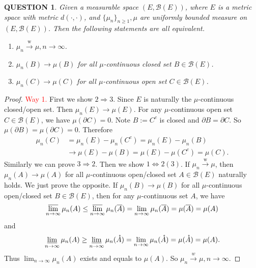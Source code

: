 \documentclass[12pt]{article}
\renewcommand{\b}{\mathscr{B}}
\renewcommand{\(}{\left(}%
\renewcommand{\)}{\right)}%
\renewcommand{\[}{\left[}%
\renewcommand{\]}{\right]}%
\newtheorem{question}{QUESTION}[section]}
\newtheorem{proof}{Proof.}}
\begin{document}
  \begin{question}
  	Given a measurable space $(E,\b(E))$, where $E$ is a metric space with metric $d(\cdot,\cdot)$, and $\{\mu_n\}_{n\geq 1},\mu$ are uniformly bounded measure on $(E,\b(E))$. Then the following statements are all equivalent.
  	\begin{enumerate}
  		\item $\mu_n\overset{\mathrm{w}}{\to}\mu,n\to\infty$.
  		\item $\mu_n(B)\to\mu(B)$ for all $\mu$-continuous closed set $B\in\b(E)$.
  		\item $\mu_n(C)\to\mu(C)$ for all $\mu$-continuous open set $C\in\b(E)$.
  	\end{enumerate}
  \end{question}
  \begin{proof}
  	
  	\textcolor{red}{\sffamily Way 1.} 
  	First we show $2\Rightarrow 3$. Since $E$ is naturally the $\mu$-continuous closed/open set. Then $\mu_n(E)\to\mu(E)$. For any $\mu$-continuous open set $C\in\b(E)$, we have $\mu(\partial C)=0$. Note $B:=C^c$ is closed and $\partial B=\partial C$. So $\mu(\partial B)=\mu(\partial C)=0$. Therefore
  	\begin{equation*}
  		\begin{split}
  			\mu_n(C)&=\mu_n(E)-\mu_n(C^c)=\mu_n(E)-\mu_n(B)\\
  			&\to \mu(E)-\mu(B)=\mu(E)-\mu(C^c)=\mu(C).
  		\end{split}
  	\end{equation*}
  	Similarly we can prove $3\Rightarrow 2$. Then we show $1\Leftrightarrow 2(3)$. If $\mu_n\overset{\mathrm{w}}{\to}\mu$, then $\mu_n(A)\to\mu(A)$ for all $\mu$-continuous open/closed set $A\in\b(E)$ naturally holds. We just prove the opposite. If $\mu_n(B)\to\mu(B)$ for all $\mu$-continuous open/closed set $B\in\b(E)$, then for any $\mu$-continuous set $A$, we have
  	\begin{equation*}
  		\varlimsup_{n\to\infty} \mu_n(A)\leq \varlimsup_{n\to\infty}\mu_n(\overline{A})=\lim_{n\to\infty}\mu_n(\overline{A})= \mu(\overline{A})=\mu(A)
  	\end{equation*}
  	and
  	\begin{equation*}
  		\varliminf_{n\to\infty} \mu_n(A)\geq \varliminf_{n\to\infty}\mu_n(\mathring{A})=\lim_{n\to\infty}\mu_n(\mathring{A})= \mu(\mathring{A})=\mu(A).
  	\end{equation*}
  	Thus $\lim_{n\to\infty}\mu_n(A)$ exists and equals to $\mu(A)$. So $\mu_n\overset{w}{\to}\mu,n\to\infty$.
  	

\end{proof}
\end{document}
